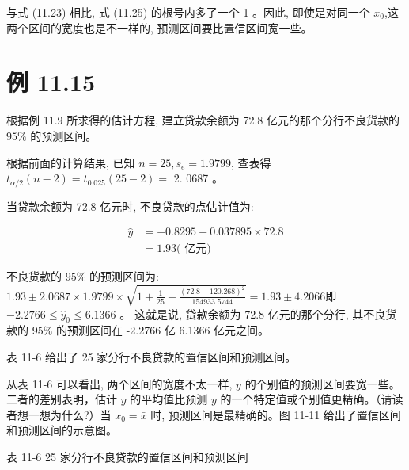 \documentclass[10pt]{article}
\begin{document}
\begin{CJK*}{UTF8}{bsmi}
与式 (11.23) 相比, 式 (11.25) 的根号内多了一个 1 。因此, 即使是对同一个 $x_{0}$,这两个区间的宽度也是不一样的, 预测区间要比置信区间宽一些。

\section*{例 11.15}
根据例 11.9 所求得的估计方程, 建立贷款余额为 72.8 亿元的那个分行不良货款的 $95 \%$ 的预测区间。

根据前面的计算结果, 已知 $n=25, s_{e}=1.9799$, 查表得 $t_{\alpha / 2}(n-2)=t_{0.025}(25-2)=$ 2. 0687 。

当贷款余额为 72.8 亿元时, 不良贷款的点估计值为:

$$
\begin{aligned}
\hat{y} & =-0.8295+0.037895 \times 72.8 \\
& =1.93(\text { 亿元) }
\end{aligned}
$$

不良货款的 $95 \%$ 的预测区间为:\\
$1.93 \pm 2.0687 \times 1.9799 \times \sqrt{1+\frac{1}{25}+\frac{(72.8-120.268)^{2}}{154933.5744}}=1.93 \pm 4.2066$即 $-2.2766 \leqslant \hat{y}_{0} \leqslant 6.1366$ 。 这就是说, 贷款余额为 72.8 亿元的那个分行, 其不良货款的 $95 \%$ 的预测区间在 -2.2766 亿 6.1366 亿元之间。

表 11-6 给出了 25 家分行不良贷款的置信区间和预测区间。

从表 11-6 可以看出, 两个区间的宽度不太一样, $y$ 的个别值的预测区间要宽一些。二者的差别表明，估计 $y$ 的平均值比预测 $y$ 的一个特定值或个别值更精确。（请读者想一想为什么?）当 $x_{0}=\bar{x}$ 时, 预测区间是最精确的。图 11-11 给出了置信区间和预测区间的示意图。

表 11-6 25 家分行不良贷款的置信区间和预测区间


\end{CJK*}
\end{document}
